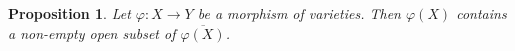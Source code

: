 \documentclass[]{pcmi}
\theoremstyle{plain}
\newtheorem{Proposition}[equation]{Proposition}
\theoremstyle{definition}
\begin{document}
\begin{Proposition}\label{prop:1.6}
    Let $\varphi : X \to Y$ be a morphism of varieties. Then $\varphi(X)$ contains a non-empty open subset of $\overline{\varphi(X)}$. 
\end{Proposition}
%    
%
%
%
%             
%   
%
%  

\bibspread




\vfill\eject
\end{document}
